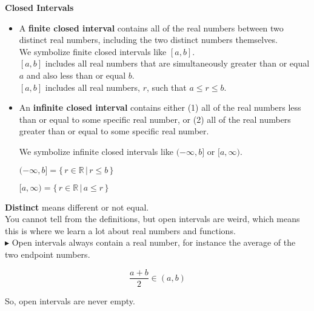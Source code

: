 \documentclass{ximera}
\begin{document}
\begin{definition}  \textbf{\textcolor{green!50!black}{Closed Intervals}} 



\begin{itemize}
\item A \textbf{finite closed interval} contains all of the real numbers between two distinct real numbers, including the two distinct numbers themselves.\\

We symbolize finite closed intervals like $[a, b]$. \\
$[a,b]$ includes all real numbers that are simultaneously greater than or equal $a$ and also less than or equal $b$.  \\
$[a,b]$ includes all real numbers, $r$, such that $a \leq r \leq b$.



\item An \textbf{infinite closed interval} contains either (1) all of the real numbers less than or equal to some specific real number, or (2) all of the real numbers greater than or equal to some specific real number.

We symbolize infinite closed intervals like $(-\infty, b]$ or $[a, \infty)$.


$(-\infty, b] = \{ \, r \in \mathbb{R} \, | \,  r \leq b  \,   \}$

$[a, \infty) = \{ \, r \in \mathbb{R} \, | \,  a \leq r   \,  \}$

\end{itemize}


\end{definition}
\textbf{Distinct} means different or not equal. \\









You cannot tell from the definitions, but open intervals are weird, which means this is where we learn a lot about real numbers and functions. \\


$\blacktriangleright$  Open intervals always contain a real number, for instance the average of the two endpoint numbers.



\[  \frac{a+b}{2}  \in (a,b)    \]



So, open intervals are never empty.  \\
\end{document}
